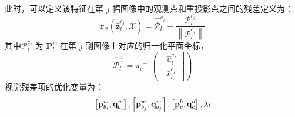 此时，可以定义该特征在第 $j$ 幅图像中的观测点和重投影点之间的残差定义为：
\begin{equation}
\label{eqn:4.19}
\mathbf{r}_\mathcal{C}(\hat{\mathbf{z}}_l^{c_j},\mathcal{X})= 
\hat{\bar{\mathcal{P}}}_l^{c_j}-\frac{ \mathcal{P}_l^{c_j} }{\left\|\mathcal{P}_l^{c_j}\right\|}
\end{equation}
其中$\mathcal{P}_l^{c_j} $ 为 $\mathbf{P}_l^{w} $ 在第 $j$ 副图像上对应的归一化平面坐标，
\begin{equation}
\label{eqn:4.20}
\hat{\bar{\mathcal{P}}}_l^{c_j}={\pi_c}^{-1}
(\begin{bmatrix}  \hat{u}_l^{c_j} \\ \hat{v}_l^{c_j}
\end{bmatrix})
\end{equation}
视觉残差项的优化变量为：
\[
\setlength{\abovedisplayskip}{6pt}
\setlength{\belowdisplayskip}{6pt}
\left[ \mathbf{p}_{b_{i}}^{w}, \mathbf{q}_{b_{i}}^{w}\right], 
\left[ \mathbf{p}_{b_{j}}^{w}, \mathbf{q}_{b_{j}}^{w}\right], 
\left[ \mathbf{p}_{c}^{b}, \mathbf{q}_{c}^{b}\right], 
\lambda_{l}
\]

